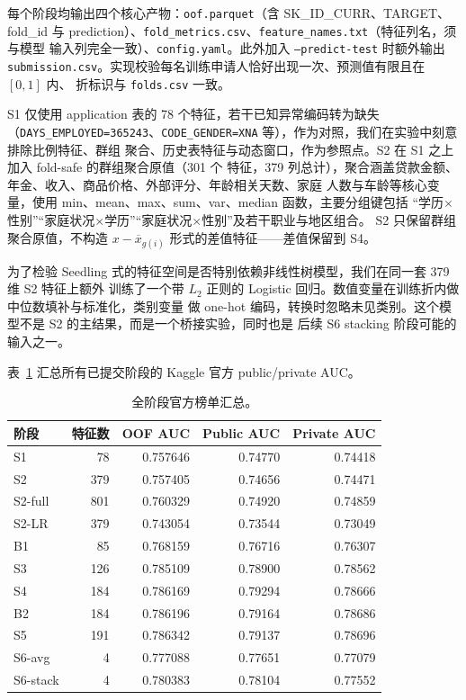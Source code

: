 \documentclass[12pt,UTF8,fontset=windows]{ctexart}
\begin{document}
每个阶段均输出四个核心产物：\texttt{oof.parquet}（含 SK\_ID\_CURR、TARGET、fold\_id 与
prediction）、\texttt{fold\_metrics.csv}、\texttt{feature\_names.txt}（特征列名，须与模型
输入列完全一致）、\texttt{config.yaml}。此外加入 \texttt{--predict-test} 时额外输出
\texttt{submission.csv}。实现校验每名训练申请人恰好出现一次、预测值有限且在 $[0,1]$ 内、
折标识与 \texttt{folds.csv} 一致。

S1 仅使用 application 表的 78 个特征，若干已知异常编码转为缺失
（\texttt{DAYS\_EMPLOYED=365243}、\texttt{CODE\_GENDER=XNA} 等），作为对照，我们在实验中刻意排除比例特征、群组
聚合、历史表特征与动态窗口，作为参照点。S2 在 S1 之上加入 fold-safe 的群组聚合原值（301 个
特征，379 列总计），聚合涵盖贷款金额、年金、收入、商品价格、外部评分、年龄相关天数、家庭
人数与车龄等核心变量，使用 min、mean、max、sum、var、median 函数，主要分组键包括
“学历$\times$性别”“家庭状况$\times$学历”“家庭状况$\times$性别”及若干职业与地区组合。
S2 只保留群组聚合原值，不构造 $x-\overline{x}_{g(i)}$ 形式的差值特征——差值保留到 S4。

为了检验 Seedling 式的特征空间是否特别依赖非线性树模型，我们在同一套 379 维 S2 特征上额外
训练了一个带 $L_2$ 正则的 Logistic 回归。数值变量在训练折内做中位数填补与标准化，类别变量
做 one-hot 编码，转换时忽略未见类别。这个模型不是 S2 的主结果，而是一个桥接实验，同时也是
后续 S6 stacking 阶段可能的输入之一。

表~\ref{tab:official} 汇总所有已提交阶段的 Kaggle 官方 public/private AUC。

\begin{table}[h]
\centering\footnotesize
\caption{全阶段官方榜单汇总。}\label{tab:official}
\begin{tabular}{lrrrr}
\toprule
阶段 & 特征数 & OOF AUC & Public AUC & Private AUC \\
\midrule
S1 & 78  & 0.757646 & 0.74770 & 0.74418 \\
S2 & 379 & 0.757405 & 0.74656 & 0.74471 \\
S2-full & 801 & 0.760329 & 0.74920 & 0.74859 \\
S2-LR & 379 & 0.743054 & 0.73544 & 0.73049 \\
B1 & 85  & 0.768159 & 0.76716 & 0.76307 \\
S3 & 126 & 0.785109 & 0.78900 & 0.78562 \\
S4 & 184 & 0.786169 & 0.79294 & 0.78666 \\
B2 & 184 & 0.786196 & 0.79164 & 0.78686 \\
S5 & 191 & 0.786342 & 0.79137 & 0.78696 \\
S6-avg & 4 & 0.777088 & 0.77651 & 0.77079 \\
S6-stack & 4 & 0.780383 & 0.78104 & 0.77552 \\
\bottomrule
\end{tabular}
\end{table}
\end{document}
